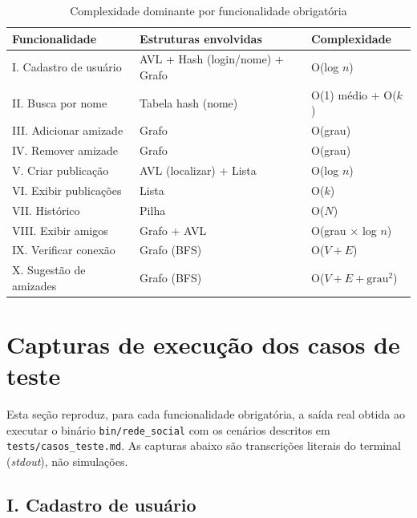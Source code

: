 \documentclass[
	12pt,				%
	oneside,			%
	a4paper,			%
	chapter=TITLE,		%
	brazil,				%
	]{abntex2}
\providecommand{\legend}[1]{\par\vspace{-0.4\baselineskip}{\footnotesize #1\par}\vspace{0.2cm}}
\begin{document}
\begin{table}[htb]
\caption{Complexidade dominante por funcionalidade obrigatória}
\label{tab:complexidade-func}
\centering
\begin{tabular}{lll}
\toprule
\textbf{Funcionalidade} & \textbf{Estruturas envolvidas} & \textbf{Complexidade} \\
\midrule
I. Cadastro de usuário         & AVL + Hash (login/nome) + Grafo & O(log $n$) \\
II. Busca por nome              & Tabela hash (nome)              & O(1) médio + O($k$) \\
III. Adicionar amizade          & Grafo                           & O(grau) \\
IV. Remover amizade             & Grafo                           & O(grau) \\
V. Criar publicação             & AVL (localizar) + Lista         & O(log $n$) \\
VI. Exibir publicações          & Lista                           & O($k$) \\
VII. Histórico                  & Pilha                           & O($N$) \\
VIII. Exibir amigos             & Grafo + AVL                     & O(grau $\times$ log $n$) \\
IX. Verificar conexão           & Grafo (BFS)                     & O($V+E$) \\
X. Sugestão de amizades         & Grafo (BFS)                     & O($V+E+\text{grau}^2$) \\
\bottomrule
\end{tabular}
\legend{Fonte: elaborado pelos autores. $k$ representa o número de itens
retornados (amigos, publicações ou resultados de busca).}
\end{table}

\section{Capturas de execução dos casos de teste}
\label{sec:capturas}

Esta seção reproduz, para cada funcionalidade obrigatória, a saída real
obtida ao executar o binário \texttt{bin/\allowbreak rede\_social} com os
cenários descritos em \texttt{tests/\allowbreak casos\_teste.md}. As capturas abaixo são
transcrições literais do terminal (\emph{stdout}), não simulações.

\subsection{I. Cadastro de usuário}
\end{document}
